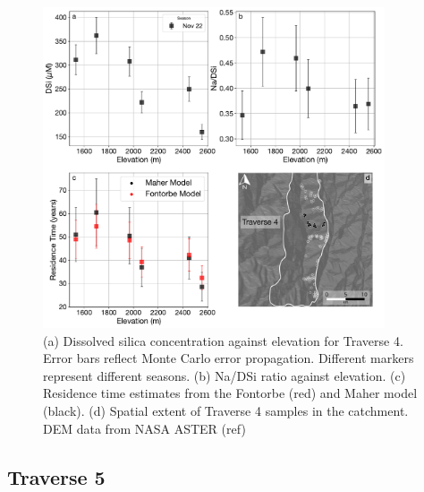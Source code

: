\begin{figure}[h]
    \centering
        \includegraphics[width=0.9\textwidth]{Traverse_4_summary.pdf}
    \caption{(a) Dissolved silica concentration against elevation for Traverse 4. Error bars reflect Monte Carlo error propagation. Different markers represent different seasons. (b) Na/DSi ratio against elevation. (c) Residence time estimates from the Fontorbe (red) and Maher model (black). (d) Spatial extent of Traverse 4 samples in the catchment. DEM data from NASA ASTER (ref)}
    \label{fig:trav4}
\end{figure}

\FloatBarrier


\subsection{Traverse 5}

